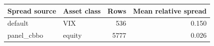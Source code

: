 \begin{tabular}{llrr}
\toprule
Spread source & Asset class & Rows & Mean relative spread \\
\midrule
default & VIX & 536 & 0.150 \\
panel\_cbbo & equity & 5777 & 0.026 \\
\bottomrule
\end{tabular}
